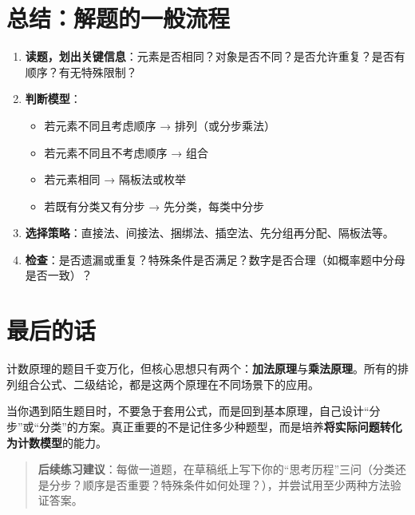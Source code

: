 \documentclass[10pt]{article}
\begin{document}
\section{总结：解题的一般流程}

\begin{enumerate}
\item \textbf{读题，划出关键信息}：元素是否相同？对象是否不同？是否允许重复？是否有顺序？有无特殊限制？
\item \textbf{判断模型}：
\begin{itemize}
\item 若元素不同且考虑顺序 → 排列（或分步乘法）
\item 若元素不同且不考虑顺序 → 组合
\item 若元素相同 → 隔板法或枚举
\item 若既有分类又有分步 → 先分类，每类中分步
\end{itemize}
\item \textbf{选择策略}：直接法、间接法、捆绑法、插空法、先分组再分配、隔板法等。
\item \textbf{检查}：是否遗漏或重复？特殊条件是否满足？数字是否合理（如概率题中分母是否一致）？
\end{enumerate}

\section*{最后的话}

计数原理的题目千变万化，但核心思想只有两个：\textbf{加法原理}与\textbf{乘法原理}。所有的排列组合公式、二级结论，都是这两个原理在不同场景下的应用。

当你遇到陌生题目时，不要急于套用公式，而是回到基本原理，自己设计“分步”或“分类”的方案。真正重要的不是记住多少种题型，而是培养\textbf{将实际问题转化为计数模型}的能力。

\begin{quote}
\textbf{后续练习建议}：每做一道题，在草稿纸上写下你的“思考历程”三问（分类还是分步？顺序是否重要？特殊条件如何处理？），并尝试用至少两种方法验证答案。
\end{quote}
\end{document}

